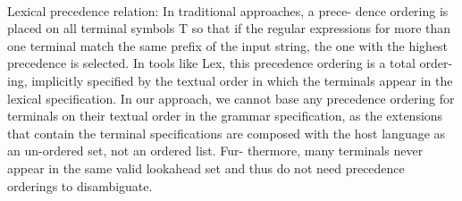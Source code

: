 
\HRule{}\\
Lexical precedence relation:    In traditional approaches, a prece-
dence ordering is placed on all terminal symbols T so that if the
regular expressions for more than one terminal match the same prefix
of the input string, the one with the highest precedence is selected.
In tools like Lex, this precedence ordering is a total order- ing,
implicitly specified by the textual order in which the terminals
appear in the lexical specification.
In our approach, we cannot base any precedence ordering for terminals
on their textual order in the grammar specification, as the extensions
that contain the terminal specifications are composed with the host
language as an un-ordered set, not an ordered list. Fur- thermore,
many terminals never appear in the same valid lookahead set and
thus do not need precedence orderings to disambiguate.

\HRule{}\\




